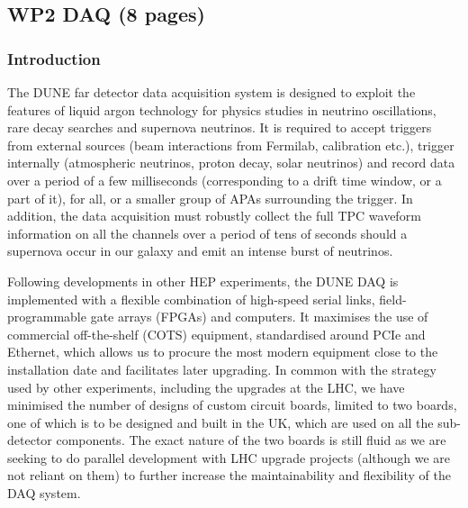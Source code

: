 \newpage
\subsection{WP2 DAQ (8 pages)}


\subsubsection{Introduction}

The DUNE far detector data acquisition system is designed to exploit
the features of liquid argon technology for physics studies
in neutrino oscillations, rare decay searches and supernova neutrinos.
It is required to accept triggers from external sources (beam
interactions from Fermilab, calibration etc.), trigger internally
(atmospheric neutrinos, proton decay, solar neutrinos) and record data
over a period of a few milliseconds (corresponding to a drift time
window, or a part of it), for all, or a smaller group of APAs
surrounding the trigger.  In addition, the data acquisition must
robustly collect the full TPC waveform information on all the channels
over a period of tens of seconds should a supernova occur in our
galaxy and emit an intense burst of neutrinos.

Following developments in other HEP experiments, the DUNE DAQ is implemented
with a flexible combination of high-speed serial links, field-programmable
gate arrays (FPGAs) and computers.  It maximises the use of commercial
off-the-shelf (COTS) equipment, standardised around PCIe and Ethernet,
which allows us to procure the most modern equipment close to the installation
date and facilitates later upgrading.  In common with the strategy used by
other experiments, including the upgrades at the LHC, we have minimised the
number of designs of custom circuit boards, limited to two boards, one of 
which is to be designed and built in the UK, which are
used on all the sub-detector components.  The exact nature of the two
boards is still fluid as we are seeking to do parallel development with
LHC upgrade projects (although we are not reliant on them) to further increase
the maintainability and flexibility of the DAQ system.

